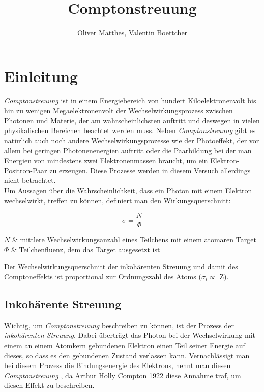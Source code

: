 \documentclass[slug=CS, room=Andreas-Schubert-Bau\,\ Labor\ 406,
supervisor=Juliane\ Volkmer, coursedate=29.\ 11.\ 2019]{../../Lab_Report_LaTeX/lab_report}
\title{Comptonstreuung}
\author{Oliver Matthes, Valentin Boettcher}
\newcommand{\cs}{\emph{Comptonstreuung }}
\begin{document}
\maketitle

\section{Einleitung}
\label{sec:einl}

\cs ist in einem Energiebereich von hundert Kiloelektronenvolt bis hin zu wenigen
Megaelektronenvolt der Wechselwirkungsprozess zwischen Photonen und Materie, der am
 wahrscheinlichsten auftritt und deswegen in vielen physikalischen Bereichen beachtet werden muss.
Neben \cs gibt es natürlich auch noch andere Wechselwirkungsprozesse wie der
Photoeffekt, der vor allem bei geringen Photonenenergien auftritt oder die Paarbildung bei
der man Energien von mindestens zwei Elektronenmassen braucht, um ein Elektron-Positron-Paar
zu erzeugen. Diese Prozesse werden in diesem Versuch allerdings nicht betrachtet.\\

Um Aussagen über die Wahrscheinlichkeit, dass ein Photon mit einem Elektron wechselwirkt,
treffen zu können, definiert man den Wirkungsquerschnitt:

\begin{equation}\label{eq:wirkquer}
	\sigma = \frac{N}{\Phi}
\end{equation}

\begin{conditions}
	\(N\) & mittlere Wechselwirkungsanzahl eines Teilchens mit einem atomaren Target \\
	\(\Phi\) & Teilchenfluenz, dem das Target ausgesetzt ist
\end{conditions}

Der Wechselwirkungsquerschnitt der inkohärenten Streuung und damit des Comptoneffekts ist
proportional zur Ordnungszahl des Atoms (\(\sigma_i \propto\) Z).\\

\subsection{Inkohärente Streuung}
\label{sec:inkostreu}

Wichtig, um \cs beschreiben zu können, ist der Prozess der \emph{inkohärenten Streuung}.
Dabei überträgt das Photon bei der Wechselwirkung mit einem an einem Atomkern gebundenen
Elektron einen Teil seiner Energie auf dieses, so dass es den gebundenen Zustand verlassen kann.
Vernachlässigt man bei diesem Prozess die Bindungsenergie des Elektrons, nennt man diesen \cs,
da Arthur Holly Compton 1922 diese Annahme traf, um diesen Effekt zu beschreiben.\\
\end{document}
